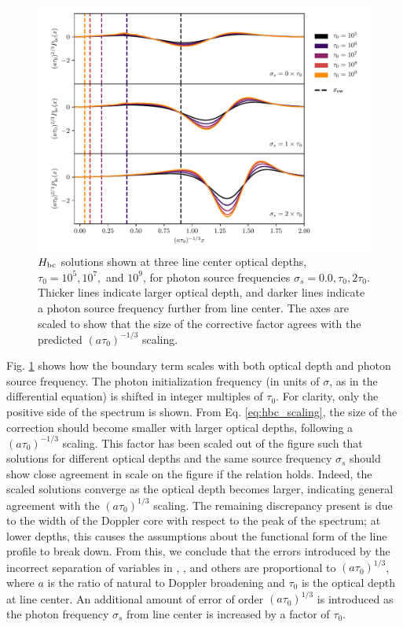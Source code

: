 \documentclass{aastex63}
\begin{document}
\begin{figure}
    \centering
    \includegraphics{xinit.pdf}
    \caption{$H_{\rm bc}$ solutions shown at three line center optical depths, $\tau_0=10^5, 10^7,$ and $10^9$, for photon source frequencies $\sigma_s=0.0, \tau_0, 2\tau_0$. Thicker lines indicate larger optical depth, and darker lines indicate a photon source frequency further from line center. The axes are scaled to show that the size of the corrective factor agrees with the predicted $(a\tau_0)^{-1/3}$ scaling.}
    \label{fig:xinit}
\end{figure}

Fig. \ref{fig:xinit} shows how the boundary term scales with both optical depth and photon source frequency. The photon initialization frequency (in units of $\sigma$, as in the differential equation) is shifted in integer multiples of $\tau_0$. For clarity, only the positive side of the spectrum is shown. From Eq. \ref{eq:hbc_scaling}, the size of the correction should become smaller with larger optical depths, following a $(a\tau_0)^{-1/3}$ scaling. This factor has been scaled out of the figure such that solutions for different optical depths and the same source frequency $\sigma_s$ should show close agreement in scale on the figure if the relation holds. Indeed, the scaled solutions converge as the optical depth becomes larger, indicating general agreement with the $(a\tau_0)^{1/3}$ scaling. The remaining discrepancy present is due to the width of the Doppler core with respect to the peak of the spectrum; at lower depths, this causes the assumptions about the functional form of the line profile to break down. From this, we conclude that the errors introduced by the incorrect separation of variables in \cite{1973MNRAS.162...43H}, \cite{1990ApJ...350..216N}, \cite{2006ApJ...649...14D} and others are proportional to $(a\tau_0)^{1/3}$, where $a$ is the ratio of natural to Doppler broadening and $\tau_0$ is the optical depth at line center. An additional amount of error of order $(a\tau_0)^{1/3}$ is introduced as the photon frequency $\sigma_s$ from line center is increased by a factor of $\tau_0$.
\end{document}

